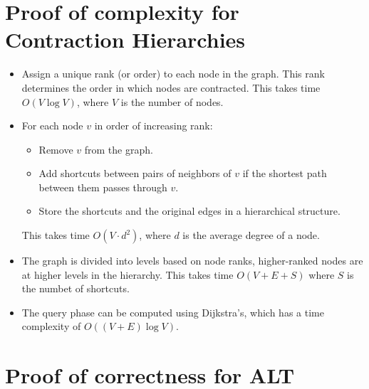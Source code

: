 \begin{appendices}
\section{Proof of complexity for Contraction Hierarchies}\label{appendix:constraction:complexity}
	\begin{itemize}
		\item Assign a unique rank (or order) to each node in the graph. This rank determines the order in which nodes are contracted. This takes time $O(V \log V)$, where $V$ is the number of nodes.
		\item For each node $v$ in order of increasing rank:
			\begin{itemize}
				\item Remove $v$ from the graph.
				\item Add shortcuts between pairs of neighbors of $v$ if the shortest path between them passes through $v$.
				\item Store the shortcuts and the original edges in a hierarchical structure.
			\end{itemize}
			This takes time $O(V \cdot d^{2})$, where $d$ is the average degree of a node.
		\item The graph is divided into levels based on node ranks, higher-ranked nodes are at higher levels in the hierarchy. This takes time $O(V + E + S)$ where $S$ is the numbet of shortcuts.
		\item The query phase can be computed using Dijkstra's, which has a time complexity of $O((V + E) \log V)$.
	\end{itemize}

\section{Proof of correctness for ALT}\label{appendix:ALT:correctness}


\end{appendices}
